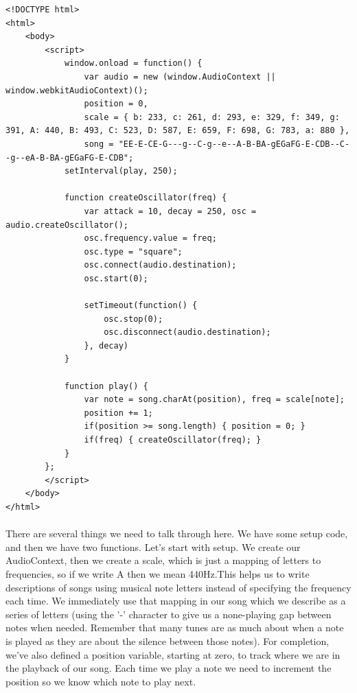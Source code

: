 \begin{lstlisting}
<!DOCTYPE html>
<html>
    <body>
        <script>
            window.onload = function() {
                var audio = new (window.AudioContext || window.webkitAudioContext)(); 
                position = 0,
                scale = { b: 233, c: 261, d: 293, e: 329, f: 349, g: 391, A: 440, B: 493, C: 523, D: 587, E: 659, F: 698, G: 783, a: 880 },
                song = "EE-E-CE-G---g--C-g--e--A-B-BA-gEGaFG-E-CDB--C--g--eA-B-BA-gEGaFG-E-CDB";
            setInterval(play, 250);

            function createOscillator(freq) {
                var attack = 10, decay = 250, osc = audio.createOscillator();
                osc.frequency.value = freq;
                osc.type = "square";
                osc.connect(audio.destination);
                osc.start(0);

                setTimeout(function() {
                    osc.stop(0);
                    osc.disconnect(audio.destination);
                }, decay)
            }

            function play() {
                var note = song.charAt(position), freq = scale[note];
                position += 1;
                if(position >= song.length) { position = 0; }
                if(freq) { createOscillator(freq); }
            }
        };
        </script>
    </body>
</html>
\end{lstlisting}

\paragraph{} There are several things we need to talk through here. We have some setup code, and then we have two functions. Let's start with setup. We create our AudioContext, then we create a scale, which is just a mapping of letters to frequencies, so if we write A then we mean 440Hz.This helps us to write descriptions of songs using musical note letters instead of specifying the frequency each time. We immediately use that mapping in our song which we describe as a series of letters (using the '-' character to give us a none-playing gap between notes when needed. Remember that many tunes are as much about when a note is played as they are about the silence between those notes). For completion, we've also defined a position variable, starting at zero, to track where we are in the playback of our song. Each time we play a note we need to increment the position so we know which note to play next. 
